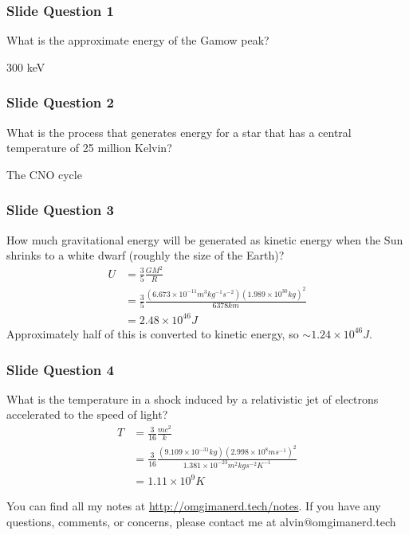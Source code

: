 \documentclass{math}
\begin{document}
\subsubsection*{Slide Question 1}
What is the approximate energy of the Gamow peak? \par
300 keV

\subsubsection*{Slide Question 2}
What is the process that generates energy for a star that has a central
temperature of 25 million Kelvin? \par
The CNO cycle

\subsubsection*{Slide Question 3}
How much gravitational energy will be generated as kinetic energy when the Sun
shrinks to a white dwarf (roughly the size of the Earth)?
\begin{align*}
  U &= \frac{3}{5}\frac{GM^2}{R} \\
  &= \frac{3}{5}\frac{(6.673\times10^{-11}m^3kg^{-1}s^{-2})
    (1.989\times10^{30}kg)^2}{6378km} \\
  &= 2.48\times10^{46}J
\end{align*}
Approximately half of this is converted to kinetic energy, so
\( \sim1.24\times10^{46}J \).

\subsubsection*{Slide Question 4}
What is the temperature in a shock induced by a relativistic jet of electrons
accelerated to the speed of light?
\begin{align*}
  T &= \frac{3}{16}\frac{mc^2}{k} \\
  &= \frac{3}{16}\frac{(9.109\times10^{-31}kg)(2.998\times10^8ms^{-1})^2}
    {1.381\times10^{-23}m^2kgs^{-2}K^{-1}} \\
  &= 1.11\times10^9 K
\end{align*}

\begin{center}
  You can find all my notes at \url{http://omgimanerd.tech/notes}. If you have
  any questions, comments, or concerns, please contact me at
  alvin@omgimanerd.tech
\end{center}
\end{document}
